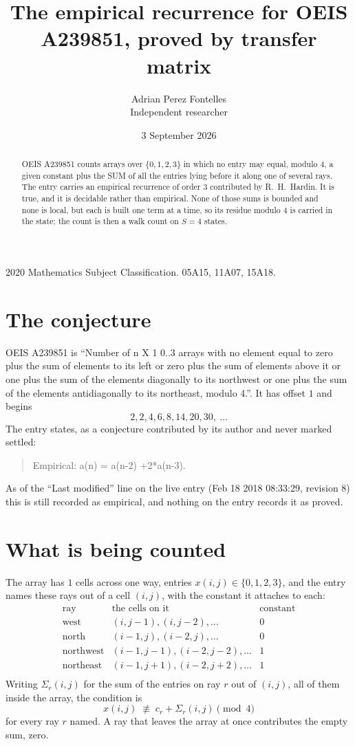 \documentclass[11pt,a4paper]{article}
\title{The empirical recurrence for OEIS A239851, proved by transfer matrix}
\author{Adrian Perez Fontelles\\ \small Independent researcher}
\date{3 September 2026}
\theoremstyle{plain}
\theoremstyle{definition}
\begin{document}
\maketitle

\begin{abstract}
OEIS A239851 counts arrays over $\{0,1,2,3\}$ in which no entry may equal, modulo $4$, a given
constant plus the SUM of all the entries lying before it along one of several rays. The entry
carries an empirical recurrence of order $3$ contributed by R.~H.~Hardin. It is true, and
it is decidable rather than empirical. None of those sums is bounded and none is local, but
each is built one term at a time, so its residue modulo $4$ is carried in the state; the
count is then a walk count on $S=4$ states.
\end{abstract}

\noindent\small 2020 Mathematics Subject Classification. 05A15, 11A07, 15A18.\normalsize

\section{The conjecture}

OEIS A239851 is ``Number of n X 1 0..3 arrays with no element equal to zero plus the sum of elements to its left or zero plus the sum of elements above it or one plus the sum of the elements diagonally to its northwest or one plus the sum of the elements antidiagonally to its northeast, modulo 4.''. It has offset $1$ and begins
\[
2, 2, 4, 6, 8, 14, 20, 30,\ \dots
\]
The entry states, as a conjecture contributed by its author and never marked settled:
\begin{quote}
Empirical: a(n) = a(n-2) +2*a(n-3).
\end{quote}
As of the ``Last modified'' line on the live entry (Feb 18 2018 08:33:29, revision 8) this is still
recorded as empirical, and nothing on the entry records it as proved.

\section{What is being counted}

The array has $1$ cells across one way, entries $x(i,j)\in\{0,1,2,3\}$, and the entry names these
rays out of a cell $(i,j)$, with the constant it attaches to each:
\[
\begin{array}{lll}
\text{ray} & \text{the cells on it} & \text{constant} \\[2pt]
\text{west} & (i,j-1),(i,j-2),\dots & 0 \\
\text{north} & (i-1,j),(i-2,j),\dots & 0 \\
\text{northwest} & (i-1,j-1),(i-2,j-2),\dots & 1 \\
\text{northeast} & (i-1,j+1),(i-2,j+2),\dots & 1 \\
\end{array}
\]
Writing $\Sigma_r(i,j)$ for the sum of the entries on ray $r$ out of $(i,j)$, all of them
inside the array, the condition is
\[
x(i,j)\;\not\equiv\;c_r+\Sigma_r(i,j) \pmod{4}
\]
for every ray $r$ named. A ray that leaves the array at once contributes the empty sum,
zero.
\end{document}

